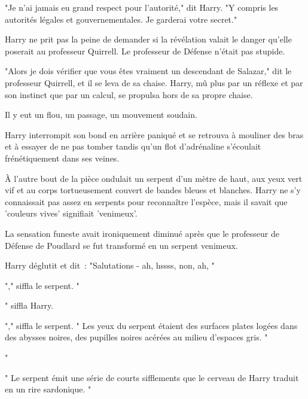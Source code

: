 "Je n'ai jamais eu grand respect pour l'autorité," dit Harry. "Y compris les autorités légales et gouvernementales. Je garderai votre secret."

Harry ne prit pas la peine de demander si la révélation valait le danger qu'elle poserait au professeur Quirrell. Le professeur de Défense n'était pas stupide.

"Alors je dois vérifier que vous êtes vraiment un descendant de Salazar," dit le professeur Quirrell, et il se leva de sa chaise. Harry, mû plus par un réflexe et par son instinct que par un calcul, se propulsa hors de sa propre chaise.

Il y eut un flou, un passage, un mouvement soudain.

Harry interrompit son bond en arrière paniqué et se retrouva à mouliner des bras et à essayer de ne pas tomber tandis qu'un flot d'adrénaline s'écoulait frénétiquement dans ses veines.

À l'autre bout de la pièce ondulait un serpent d'un mètre de haut, aux yeux vert vif et au corps tortueusement couvert de bandes bleues et blanches. Harry ne s'y connaissait pas assez en serpents pour reconnaître l'espèce, mais il savait que 'couleurs vives' signifiait 'venimeux'.

La sensation funeste avait ironiquement diminué après que le professeur de Défense de Poudlard se fut transformé en un serpent venimeux.

Harry déglutit et dit~: "Salutations - ah, hssss, non, ah,
"

"," siffla le serpent. "

" siffla Harry. 

"," siffla le serpent. " Les yeux du serpent étaient des surfaces plates logées dans des abysses noires, des pupilles noires acérées au milieu d'espaces gris. "

"

" Le serpent émit une série de courts sifflements que le cerveau de Harry traduit en un rire sardonique. "

